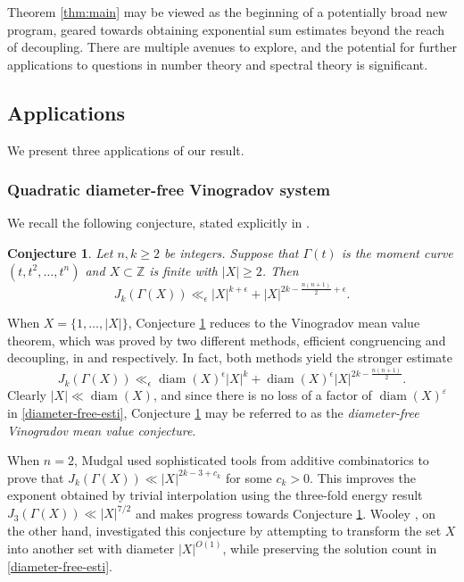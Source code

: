 \documentclass{amsart}
\numberwithin{equation}{section}
\newtheorem{conjecture}[theorem]{Conjecture}
\newcommand{\e}{\epsilon}
\newcommand{\ZZ}{\mathbb{Z}}
\begin{document}
\medskip 

Theorem \ref{thm:main} may be viewed as the beginning of a potentially broad new program, geared towards obtaining exponential sum estimates beyond the reach of decoupling. 
There are multiple avenues to explore, and the potential for further applications to questions in number theory and spectral theory is significant.


\bigskip 

\subsection{Applications}
We present three applications of our result.    

\medskip 

\subsubsection{Quadratic diameter-free Vinogradov system}
\label{Quadratic-Diameter-VMVT-section} 

We recall the following conjecture, stated explicitly in \cite{Mudgal-2020, Wooley-diameter}.

\begin{conjecture}
\label{diameter-free-VMVT}
Let $n, k\geq 2$ be integers.
Suppose that $\Gamma(t)$ is the moment curve $(t, t^2, \ldots, t^n)$ and $X\subset\ZZ$ is finite with $|X|\geq2$. 
Then
\begin{equation}
\label{diameter-free-esti}
    J_k(\Gamma(X))
    \ll_\epsilon |X|^{k+\e}+
    |X|^{2k-\frac{n(n+1)}{2}+\epsilon}.
\end{equation}
\end{conjecture}
When $X=\{1,\ldots,|X|\}$, Conjecture \ref{diameter-free-VMVT} reduces to the Vinogradov mean value theorem, which was proved by two different methods, efficient congruencing and decoupling, in \cite{Wooley-cubic, Wooley-VMVT} and \cite{BDG} respectively. 
In fact, both methods yield the stronger estimate
\[
    J_k(\Gamma(X))
    \ll_\epsilon
    \operatorname{diam}(X)^\epsilon |X|^k
    +
    \operatorname{diam}(X)^\epsilon |X|^{2k-\frac{n(n+1)}{2}}.
\] 
Clearly $|X|\ll \operatorname{diam}(X)$, and since there is no loss of a factor of $\operatorname{diam}(X)^\varepsilon$ in \eqref{diameter-free-esti}, Conjecture \ref{diameter-free-VMVT} may be referred to as the \emph{diameter-free Vinogradov mean value conjecture}.    

When $n=2$, Mudgal \cite{Mudgal} used sophisticated tools from additive combinatorics to prove that $J_k(\Gamma(X))\ll |X|^{2k-3+c_k}$ for some $c_k>0$.
This improves the exponent obtained by trivial interpolation using the three-fold energy result $J_3(\Gamma(X))\ll|X|^{7/2}$ and makes progress towards Conjecture \ref{diameter-free-VMVT}.
Wooley \cite{Wooley-diameter}, on the other hand, investigated this conjecture by attempting to transform the set $X$ into another set with diameter $|X|^{O(1)}$, while preserving the solution count in 
\eqref{diameter-free-esti}.
\end{document}
